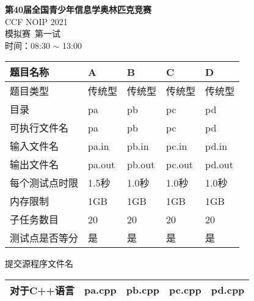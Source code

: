 \documentclass{article}
\theoremstyle{mytheoremstyle}
\theoremstyle{mytheoremstyle}
\theoremstyle{myproblemstyle}
\begin{document}
  \begin{center}
    \huge{\textbf{第40届全国青少年信息学奥林匹克竞赛}}
    ~\\[10pt]
    \huge{CCF NOIP 2021}
    ~\\[10pt]
    \huge{模拟赛\ 第一试}
    ~\\[10pt]
    \Large{时间：08:30 $\sim$ 13:00}
  \end{center}    

  \begin{table}[htbp]
      \label{tab:problems}
      \begin{center}
        \begin{tabular}{|p{2.5cm}|p{2.5cm}|p{2.5cm}|p{2.5cm}|p{2.5cm}|}
          \hline
          题目名称 & A & B & C & D\\ \hline
          题目类型 & 传统型 & 传统型 & 传统型 & 传统型\\ \hline
          目录    & pa & pb & pc & pd \\ \hline
          可执行文件名 & pa & pb & pc & pd \\ \hline
          输入文件名 & pa.in & pb.in & pc.in & pd.in \\ \hline
          输出文件名 & pa.out & pb.out & pc.out & pd.out \\ \hline
          每个测试点时限 & 1.5秒 & 1.0秒 & 1.0秒 & 1.0秒 \\ \hline
          内存限制 & 1GB & 1GB & 1GB & 1GB \\ \hline
          子任务数目 & 20 & 20 & 20 & 20 \\ \hline
          测试点是否等分 & 是 & 是 & 是 & 是 \\ \hline
          
        \end{tabular}
      \end{center}
  \end{table}

      提交源程序文件名
  
  \begin{table}[htbp]
    \label{tab:subname}
    \begin{center}
        \begin{tabular}{|p{2.5cm}|p{2.5cm}|p{2.5cm}|p{2.5cm}|p{2.5cm}|}
          \hline
          对于C++语言 & pa.cpp & pb.cpp & pc.cpp & pd.cpp \\ \hline

      \end{tabular}
    \end{center}
  \end{table}
\end{document}
